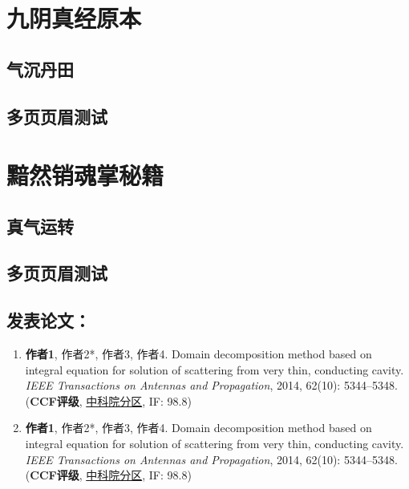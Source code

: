 \documentclass[print, doctor, vlined]{DissertUESTC}
\begin{document}
	
	
	
	\appendix
	
	\chapter{九阴真经原本}
	\section{气沉丹田}
	\newpage
	\section{多页页眉测试}
	
	\chapter{黯然销魂掌秘籍}
	\section{真气运转}
	\newpage
	\section{多页页眉测试}
	
	\achievement %
	
	\section*{发表论文：}
	
	\begin{enumerate}
	    \item \textbf{作者1}, 作者2*, 作者3, 作者4. Domain decomposition method based on integral equation for solution of scattering from very thin, conducting cavity. \emph{IEEE Transactions on Antennas and Propagation}, 2014, 62(10): 5344--5348. (\textbf{CCF评级}, \underline{中科院分区}, IF: 98.8)
	    
		\setcounter{enumi}{98}
	    
		\item \textbf{作者1}, 作者2*, 作者3, 作者4. Domain decomposition method based on integral equation for solution of scattering from very thin, conducting cavity. \emph{IEEE Transactions on Antennas and Propagation}, 2014, 62(10): 5344--5348. (\textbf{CCF评级}, \underline{中科院分区}, IF: 98.8)
	\end{enumerate}
	
\end{document}
